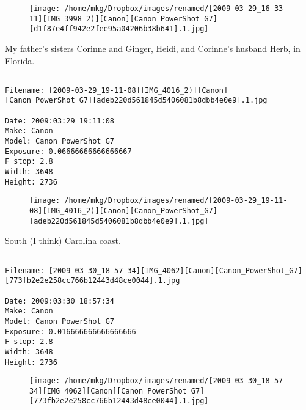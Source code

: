 \begin{figure}
\texttt{[image: /home/mkg/Dropbox/images/renamed/[2009-03-29\_16-33-11][IMG\_3998\_2)][Canon][Canon\_PowerShot\_G7][d1f87e4ff942e2fee95a04206b38b641].1.jpg]}
\end{figure}
    
\clearpage
\onecolumn
\noindent My father's sisters Corinne and Ginger, Heidi, and Corinne's husband Herb, in Florida.
\noindent
\begin{lstlisting}

Filename: [2009-03-29_19-11-08][IMG_4016_2)][Canon][Canon_PowerShot_G7][adeb220d561845d5406081b8dbb4e0e9].1.jpg

Date: 2009:03:29 19:11:08
Make: Canon
Model: Canon PowerShot G7
Exposure: 0.06666666666666667
F stop: 2.8
Width: 3648
Height: 2736
\end{lstlisting}
\clearpage

\begin{figure}
\texttt{[image: /home/mkg/Dropbox/images/renamed/[2009-03-29\_19-11-08][IMG\_4016\_2)][Canon][Canon\_PowerShot\_G7][adeb220d561845d5406081b8dbb4e0e9].1.jpg]}
\end{figure}
    
\clearpage
\onecolumn
\noindent South (I think) Carolina coast.
\noindent
\begin{lstlisting}

Filename: [2009-03-30_18-57-34][IMG_4062][Canon][Canon_PowerShot_G7][773fb2e2e258cc766b12443d48ce0044].1.jpg

Date: 2009:03:30 18:57:34
Make: Canon
Model: Canon PowerShot G7
Exposure: 0.016666666666666666
F stop: 2.8
Width: 3648
Height: 2736
\end{lstlisting}
\clearpage

\begin{figure}
\texttt{[image: /home/mkg/Dropbox/images/renamed/[2009-03-30\_18-57-34][IMG\_4062][Canon][Canon\_PowerShot\_G7][773fb2e2e258cc766b12443d48ce0044].1.jpg]}
\end{figure}
    
